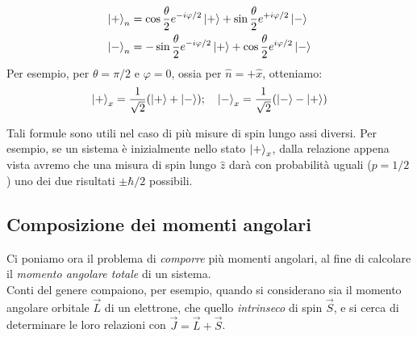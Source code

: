 \documentclass[../../FisicaTeorica.tex]{subfiles}
\begin{document}
\begin{align} \nonumber
    \Ket{+}_n &= \cos\frac{\theta}{2} e^{-i\varphi/2} \Ket{+} + \sin\frac{\theta}{2} e^{+i\varphi/2} \Ket{-}\\
    \Ket{-}_n &= -\sin\frac{\theta}{2} e^{-i\varphi/2}\Ket{+} + \cos\frac{\theta}{2} e^{i\varphi/2} \Ket{-}
    \label{eqn:spin-generici-formule}
\end{align}
Per esempio, per $\theta = \pi/2$ e $\varphi = 0$, ossia per $\hat{n}=+\hat{x}$, otteniamo:
\begin{align*}
\Ket{+}_x = \frac{1}{\sqrt{2}}(\Ket{+}+\Ket{-}); \quad \Ket{-}_x = \frac{1}{\sqrt{2}}(\Ket{-}-\Ket{+})
\end{align*}

Tali formule sono utili nel caso di più misure di spin lungo assi diversi. Per esempio, se un sistema è inizialmente nello stato $\Ket{+}_x$, dalla relazione appena vista avremo che una misura di spin lungo $\hat{z}$ darà con probabilità uguali ($p=1/2$) uno dei due risultati $\pm \hbar/2$ possibili.

\subsection{Composizione dei momenti angolari}
Ci poniamo ora il problema di \textit{comporre} più momenti angolari, al fine di calcolare il \textit{momento angolare totale} di un sistema.\\
Conti del genere compaiono, per esempio, quando si considerano sia il momento angolare orbitale $\vec{L}$ di un elettrone, che quello \textit{intrinseco} di spin $\vec{S}$, e si cerca di determinare le loro relazioni con $\vec{J}=\vec{L}+\vec{S}$.\\
\end{document}
